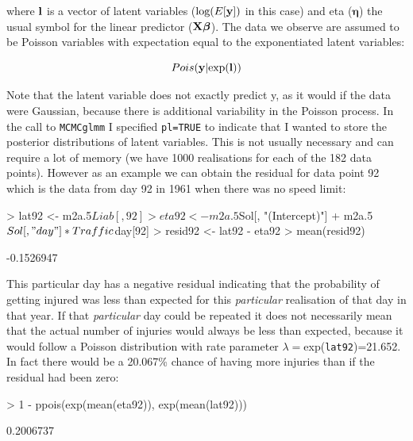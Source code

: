 \documentclass{article}
\begin{document}
where ${\bf l}$ is a vector of latent variables ($\textrm{log}(E[{\bf y}])$ in this case) and eta (${\bm \eta}$) the usual symbol for the linear predictor (${\bf X}{\bm \beta}$). The data we observe are assumed to be Poisson variables with expectation equal to the exponentiated latent variables: 

\begin{equation}
Pois({\bf y} | \textrm{exp}({\bf l}))
\end{equation}


Note that the latent variable does not exactly predict y, as it would if the data were Gaussian, because there is additional variability in the Poisson process. In the call to \texttt{MCMCglmm} I specified \texttt{pl=TRUE} to indicate that I wanted to store the posterior distributions of latent variables. This is not usually necessary and can require a lot of memory (we have 1000 realisations for each of the 182 data points). However as an example we can obtain the residual for data point 92 which is the data from day 92 in 1961 when there was no speed limit:

\begin{Schunk}
\begin{Sinput}
> lat92 <- m2a.5$Liab[, 92]
> eta92 <- m2a.5$Sol[, "(Intercept)"] + m2a.5$Sol[, "day"] * Traffic$day[92]
> resid92 <- lat92 - eta92
> mean(resid92)
\end{Sinput}
\begin{Soutput}
[1] -0.1526947
\end{Soutput}
\end{Schunk}

This particular day has a negative residual indicating that the probability of getting injured was less than expected for this \emph{particular} realisation of that day in that year. If that \emph{particular} day could be repeated it does not necessarily mean that the actual number of injuries would always be less than expected, because it would follow a Poisson distribution with rate parameter $\lambda=$exp(\texttt{lat92})=21.652. In fact there would be a 20.067\% chance of having more injuries than if the residual had been zero:

\begin{Schunk}
\begin{Sinput}
> 1 - ppois(exp(mean(eta92)), exp(mean(lat92)))
\end{Sinput}
\begin{Soutput}
[1] 0.2006737
\end{Soutput}
\end{Schunk}
\end{document}
